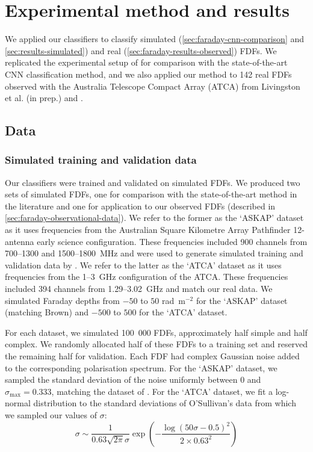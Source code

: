 \section{Experimental method and results}
\label{sec:faraday-experiment-classification}

  We applied our classifiers to classify simulated (\autoref{sec:faraday-cnn-comparison} and \ref{sec:results-simulated}) and real (\autoref{sec:faraday-results-observed}) FDFs. We replicated the experimental setup of \citet{brown_classifying_2018} for comparison with the state-of-the-art CNN classification method, and we also applied our method to 142 real FDFs observed with the Australia Telescope Compact Array (ATCA) from Livingston et al. (in prep.) and \citet{osullivan_broad-band_2017}.

  \subsection{Data}

  \subsubsection{Simulated training and validation data}
  \label{sec:faraday-simulated-training-data}

    Our classifiers were trained and validated on simulated FDFs. We produced two sets of simulated FDFs, one for comparison with the state-of-the-art method in the literature and one for application to our observed FDFs (described in \autoref{sec:faraday-observational-data}). We refer to the former as the `ASKAP' dataset as it uses frequencies from the Australian Square Kilometre Array Pathfinder 12-antenna early science configuration. These frequencies included 900 channels from 700--1300 and 1500--1800~MHz and were used to generate simulated training and validation data by \citet{brown_classifying_2018}. We refer to the latter as the `ATCA' dataset as it uses frequencies from the 1--3~GHz configuration of the ATCA. These frequencies included 394 channels from 1.29--3.02~GHz and match our real data. We simulated Faraday depths from $-50$ to $50$ rad~m$^{-2}$ for the `ASKAP' dataset (matching Brown) and $-500$ to $500$ for the `ATCA' dataset.

    For each dataset, we simulated 100~000 FDFs, approximately half simple and half complex. We randomly allocated half of these FDFs to a training set and reserved the remaining half for validation. Each FDF had complex Gaussian noise added to the corresponding polarisation spectrum. For the `ASKAP' dataset, we sampled the standard deviation of the noise uniformly between 0 and $\sigma_{\max} = 0.333$, matching the dataset of \citet{brown_classifying_2018}.
    For the `ATCA' dataset, we fit a log-normal distribution to the standard deviations of O'Sullivan's data \citep{osullivan_broad-band_2017} from which we sampled our values of $\sigma$:
    \begin{equation}
      \sigma \sim \frac{1}{0.63 \sqrt{2 \pi} \sigma} \exp \left(-\frac{\log\left(50 \sigma - 0.5\right)^2}{2 \times 0.63^2}\right)
    \end{equation}


